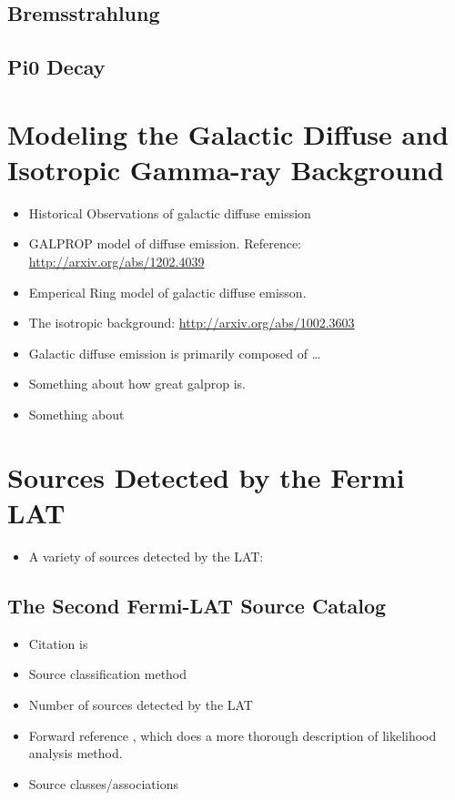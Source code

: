 \subsection{Bremsstrahlung}

\subsection{Pi0 Decay}

\section{Modeling the Galactic Diffuse and Isotropic Gamma-ray Background}

\begin{itemize}
  \item Historical Observations of galactic diffuse emission
  \item GALPROP model of diffuse emission.
  Reference: \url{http://arxiv.org/abs/1202.4039}
  \item Emperical Ring model of galactic diffuse emisson.
  \item The isotropic background: \url{http://arxiv.org/abs/1002.3603}
\end{itemize}

\begin{itemize}
  \item Galactic diffuse emission is primarily composed of \ldots
  \item Something about how great galprop is.
  \item Something about
\end{itemize}

\section{Sources Detected by the Fermi LAT}

\begin{itemize}
  \item A variety of sources detected by the LAT:
\end{itemize}

\subsection{The Second Fermi-LAT Source Catalog}

\begin{itemize}
  \item Citation is \cite{second_lat_catalog_2012}
  \item Source classification method
  \item Number of sources detected by the LAT
  \item Forward reference ,
    which does a more thorough description of likelihood analysis method.
  \item Source classes/associations
\end{itemize}

